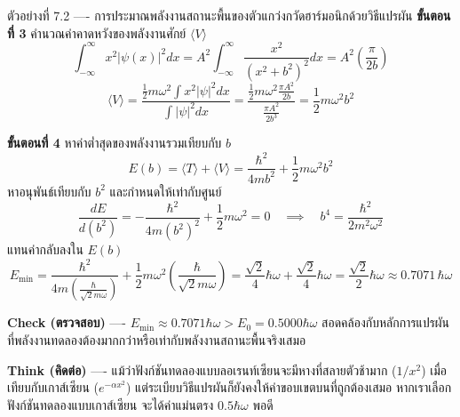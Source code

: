 \begin{psctbox}{ตัวอย่างที่ 7.2 ---- การประมาณพลังงานสถานะพื้นของตัวแกว่งกวัดฮาร์มอนิกด้วยวิธีแปรผัน}
\textbf{ขั้นตอนที่ 3} คำนวณค่าคาดหวังของพลังงานศักย์ $\langle V \rangle$
\begin{equation*}
\int_{-\infty}^\infty x^2 |\psi(x)|^2 dx = A^2 \int_{-\infty}^\infty \frac{x^2}{(x^2 + b^2)^2} dx = A^2 \left( \frac{\pi}{2 b} \right)
\end{equation*}
\begin{equation*}
\langle V \rangle = \frac{\frac{1}{2}m\omega^2 \int x^2 |\psi|^2 dx}{\int |\psi|^2 dx} = \frac{\frac{1}{2}m\omega^2 \frac{\pi A^2}{2 b}}{\frac{\pi A^2}{2 b^3}} = \frac{1}{2} m \omega^2 b^2
\end{equation*}

\textbf{ขั้นตอนที่ 4} หาค่าต่ำสุดของพลังงานรวมเทียบกับ $b$
\begin{equation*}
E(b) = \langle T \rangle + \langle V \rangle = \frac{\hbar^2}{4m b^2} + \frac{1}{2} m \omega^2 b^2
\end{equation*}
หาอนุพันธ์เทียบกับ $b^2$ และกำหนดให้เท่ากับศูนย์
\begin{equation*}
\frac{dE}{d(b^2)} = -\frac{\hbar^2}{4m (b^2)^2} + \frac{1}{2} m \omega^2 = 0 \quad \implies \quad b^4 = \frac{\hbar^2}{2 m^2 \omega^2}
\end{equation*}
แทนค่ากลับลงใน $E(b)$
\begin{equation*}
E_{\text{min}} = \frac{\hbar^2}{4m \left(\frac{\hbar}{\sqrt{2}m\omega}\right)} + \frac{1}{2} m\omega^2 \left(\frac{\hbar}{\sqrt{2}m\omega}\right) = \frac{\sqrt{2}}{4}\hbar\omega + \frac{\sqrt{2}}{4}\hbar\omega = \frac{\sqrt{2}}{2}\hbar\omega \approx 0.7071 \, \hbar\omega
\end{equation*}

\textbf{Check (ตรวจสอบ)} ---- $E_{\text{min}} \approx 0.7071\hbar\omega > E_0 = 0.5000\hbar\omega$ สอดคล้องกับหลักการแปรผันที่พลังงานทดลองต้องมากกว่าหรือเท่ากับพลังงานสถานะพื้นจริงเสมอ

\textbf{Think (คิดต่อ)} ---- แม้ว่าฟังก์ชันทดลองแบบลอเรนท์เซียนจะมีหางที่สลายตัวช้ามาก ($1/x^2$) เมื่อเทียบกับเกาส์เซียน ($e^{-\alpha x^2}$) แต่ระเบียบวิธีแปรผันก็ยังคงให้ค่าขอบเขตบนที่ถูกต้องเสมอ หากเราเลือกฟังก์ชันทดลองแบบเกาส์เซียน จะได้ค่าแม่นตรง $0.5\hbar\omega$ พอดี
\end{psctbox}


